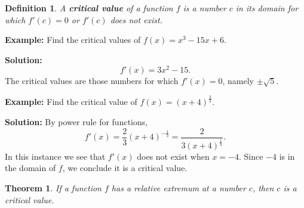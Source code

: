 \documentclass[titlepage,a4paper,12pt]{report}
\newtheorem{definition}{Definition}[section]
\newtheorem{theorem}{Theorem}[section]
\begin{document}
\begin{definition}
A \textbf{critical value} of a function $f$ is a number $c$ in its domain for which $f'(c)=0$ or $f'(c)$ does not exist.
\end{definition}
\noindent \textbf{Example:} Find the critical values of $f(x)=x^3-15x+6$.

\noindent \textbf{Solution:} 
\begin{equation*}
f'(x)=3x^2-15.
\end{equation*}
The critical values are those numbers for which $f'(x)=0$, namely $\pm \sqrt{5}$.

\noindent \textbf{Example:} Find the critical value of $f(x)=(x+4)^{\frac{2}{3}}$.

\noindent \textbf{Solution:} By power rule for functions,  
\begin{equation*}
f'(x)=\dfrac{2}{3}(x+4)^{-\frac{1}{3}}=\dfrac{2}{3(x+4)^{\frac{1}{3}}}.
\end{equation*}
In this instance we see that $f'(x)$ does not exist when $x=-4$. Since $-4$ is in the domain of $f$, we conclude it is a critical value.

\begin{theorem}
If a function $f$ has a relative extremum at a number $c$, then $c$ is a critical value.
\end{theorem}
\end{document}
